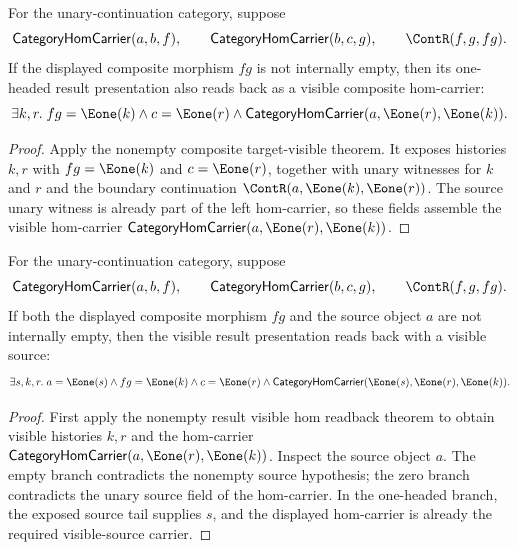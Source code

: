 \begin{theorem}
\label{thm:category-comp-nonempty-result-visible-hom-readback}
For the unary-continuation category, suppose
$$
\mathsf{CategoryHomCarrier}(a,b,f),\qquad
\mathsf{CategoryHomCarrier}(b,c,g),\qquad
\ContR(f,g,fg).
$$
If the displayed composite morphism $fg$ is not internally empty, then its
one-headed result presentation also reads back as a visible composite
hom-carrier:
$$
\exists k,r.\;
fg=\Eone(k)\land c=\Eone(r)\land
\mathsf{CategoryHomCarrier}(a,\Eone(r),\Eone(k)).
$$
\end{theorem}
\begin{proof}
Apply the nonempty composite target-visible theorem. It exposes histories
$k,r$ with $fg=\Eone(k)$ and $c=\Eone(r)$, together with unary witnesses for
$k$ and $r$ and the boundary continuation
$\ContR(a,\Eone(k),\Eone(r))$. The source unary witness is already part of the
left hom-carrier, so these fields assemble the visible hom-carrier
$\mathsf{CategoryHomCarrier}(a,\Eone(r),\Eone(k))$.
\end{proof}

\begin{theorem}
\label{thm:category-hom-carrier-comp-nonempty-result-visible-source-hom-readback}
For the unary-continuation category, suppose
$$
\mathsf{CategoryHomCarrier}(a,b,f),\qquad
\mathsf{CategoryHomCarrier}(b,c,g),\qquad
\ContR(f,g,fg).
$$
If both the displayed composite morphism $fg$ and the source object $a$ are not
internally empty, then the visible result presentation reads back with a visible
source:
$$
\exists s,k,r.\;
a=\Eone(s)\land fg=\Eone(k)\land c=\Eone(r)\land
\mathsf{CategoryHomCarrier}(\Eone(s),\Eone(r),\Eone(k)).
$$
\end{theorem}
\begin{proof}
First apply the nonempty result visible hom readback theorem to obtain visible
histories $k,r$ and the hom-carrier
$\mathsf{CategoryHomCarrier}(a,\Eone(r),\Eone(k))$. Inspect the source object
$a$. The empty branch contradicts the nonempty source hypothesis; the zero
branch contradicts the unary source field of the hom-carrier. In the one-headed
branch, the exposed source tail supplies $s$, and the displayed hom-carrier is
already the required visible-source carrier.
\end{proof}

